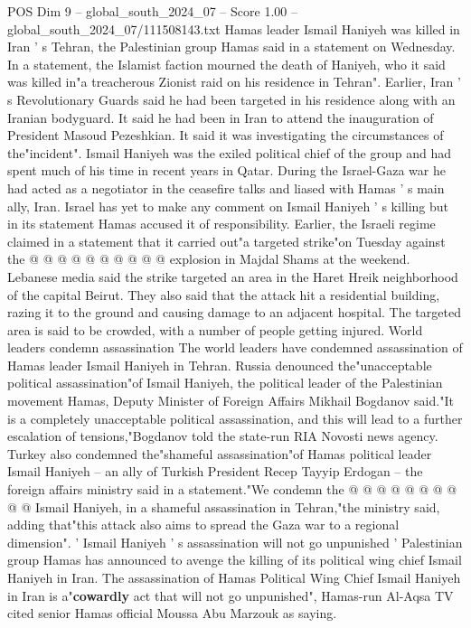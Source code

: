 \begin{textsample}{POS Dim 9 – global\_south\_2024\_07 – Score 1.00 – global\_south\_2024\_07/111508143.txt}  \label{ex:f9_pos_108}
Hamas leader Ismail Haniyeh was killed in Iran ' s Tehran, the Palestinian group Hamas said in a statement on Wednesday.
In a statement, the Islamist faction mourned the death of Haniyeh, who it said was killed in"a treacherous Zionist raid on his residence in Tehran".
Earlier, Iran ' s Revolutionary Guards said he had been targeted in his residence along with an Iranian bodyguard.
It said he had been in Iran to attend the inauguration of President Masoud Pezeshkian.
It said it was investigating the circumstances of the"incident".
Ismail Haniyeh was the exiled political chief of the group and had spent much of his time in recent years in Qatar.
During the Israel-Gaza war he had acted as a negotiator in the ceasefire talks and liased with Hamas ' s main ally, Iran.
Israel has yet to make any comment on Ismail Haniyeh ' s killing but in its statement Hamas accused it of responsibility.
Earlier, the Israeli regime claimed in a statement that it carried out"a targeted strike"on Tuesday against the @ @ @ @ @ @ @ @ @ @ explosion in Majdal Shams at the weekend.
Lebanese media said the strike targeted an area in the Haret Hreik neighborhood of the capital Beirut.
They also said that the attack hit a residential building, razing it to the ground and causing damage to an adjacent hospital.
The targeted area is said to be crowded, with a number of people getting injured.
World leaders condemn assassination The world leaders have condemned assassination of Hamas leader Ismail Haniyeh in Tehran.
Russia denounced the"unacceptable political assassination"of Ismail Haniyeh, the political leader of the Palestinian movement Hamas, Deputy Minister of Foreign Affairs Mikhail Bogdanov said."It is a completely unacceptable political assassination, and this will lead to a further escalation of tensions,"Bogdanov told the state-run RIA Novosti news agency.
Turkey also condemned the"shameful assassination"of Hamas political leader Ismail Haniyeh -- an ally of Turkish President Recep Tayyip Erdogan -- the foreign affairs ministry said in a statement."We condemn the @ @ @ @ @ @ @ @ @ @ Ismail Haniyeh, in a shameful assassination in Tehran,"the ministry said, adding that"this attack also aims to spread the Gaza war to a regional dimension". ' Ismail Haniyeh ' s assassination will not go unpunished ' Palestinian group Hamas has announced to avenge the killing of its political wing chief Ismail Haniyeh in Iran.
The assassination of Hamas Political Wing Chief Ismail Haniyeh in Iran is a"\textbf{cowardly} act that will not go unpunished", Hamas-run Al-Aqsa TV cited senior Hamas official Moussa Abu Marzouk as saying.

\end{textsample}
